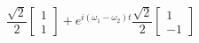 \documentclass[preview]{standalone}
\begin{document}
\begin{center}
$\dfrac{\sqrt{2}}{2} \begin{bmatrix} 1 \\ 1\end{bmatrix} + e^{i(\omega_1-\omega_2)t}\dfrac{\sqrt{2}}{2} \begin{bmatrix} 1 \\ -1\end{bmatrix}$
\end{center}
\end{document}

